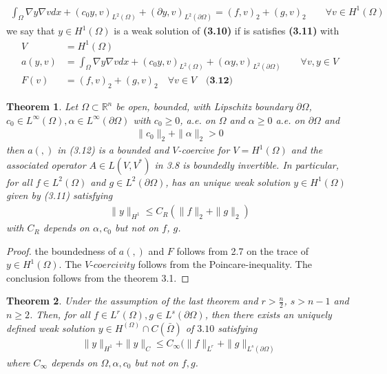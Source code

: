 \documentclass[a4paper,11pt,fleqn]{book}
\newtheorem{theorem}{Theorem}[section]
\theoremstyle{definition}
\theoremstyle{remark}
\begin{document}
\begin{align*}
	\int_\Omega \nabla y \nabla v dx + (c_0 y, v )_{L^2(\Omega)} + (\partial y, v )_{L^2(\partial \Omega)} = (f, v)_2 + (g, v)_2 \qquad \forall v \in H^1(\Omega)
\end{align*}
we say that $y \in H^1(\Omega)$ is a weak solution of \textbf{(3.10)} if is satisfies \textbf{(3.11)} with 
\begin{align*}
	V &= H^1(\Omega)\\
	a(y, v) &= \int_\Omega \nabla y \nabla v dx +  (c_0 y, v)_{L^2(\Omega)} + (\alpha y, v)_{L^2( \partial \Omega)}\qquad \forall v , y \in V\\
	F(v) &= (f, v)_2 + (g, v)_2\quad \forall v \in V \quad \textbf{(3.12)}
\end{align*}

\begin{theorem}
	Let $\Omega \subset \mathbb{R}^n$ be open, bounded, with Lipschitz boundary $\partial \Omega$, $c_0 \in L^\infty(\Omega), \alpha \in L^\infty(\partial \Omega)$ with $c_0 \geq 0$, a.e. on $\Omega$ and $\alpha \geq 0$ a.e. on $\partial \Omega$ and 
	\begin{align*}
		\|c_0\|_2 + \|\alpha\|_2 > 0
	\end{align*}
	then $a(, )$ in (3.12) is a bounded and $V$-coercive for $V = H^1(\Omega)$ and the associated operator $A \in L(V, V^*)$ in 3.8 is boundedly invertible. In particular, for all $f \in L^2(\Omega)$ and $g \in L^2(\partial \Omega)$, has an unique weak solution $y \in H^1(\Omega)$ given by (3.11) satisfying
		\begin{align*}
			\|y\|_{H^1} \le C_R (\|f\|_2 + \|g\|_2)
		\end{align*}
		with $C_R$ depends on $\alpha, c_0$ but not on $f$, $g$. 
\end{theorem}
\begin{proof}
	the boundedness of $a(, )$ and $F$ follows from 2.7 on the trace of $y \in H^1(\Omega)$. The $V$-$coercivity$ follows from the Poincare-inequality. The conclusion follows from the theorem 3.1.
\end{proof}

\begin{theorem}
	Under the assumption of the last theorem and $r > \frac{n}{2}$, $s > n -1$ and $n \geq 2$. Then, for all $f \in L^r(\Omega), g \in L^s(\partial \Omega)$, then there exists an uniquely defined weak solution $y \in H^(\Omega) \cap C(\bar{\Omega})$ of $3.10$ satisfying 
	\begin{align*}
		\|y\|_{H^1} + \|y\|_{C} \le C_\infty(\|f\|_{L^r} + \|g\|_{L^s(\partial \Omega)}
	\end{align*}
	where $C_\infty$ depends on $\Omega, \alpha, c_0$ but not on  $f, g$. 
\end{theorem}
\end{document}
